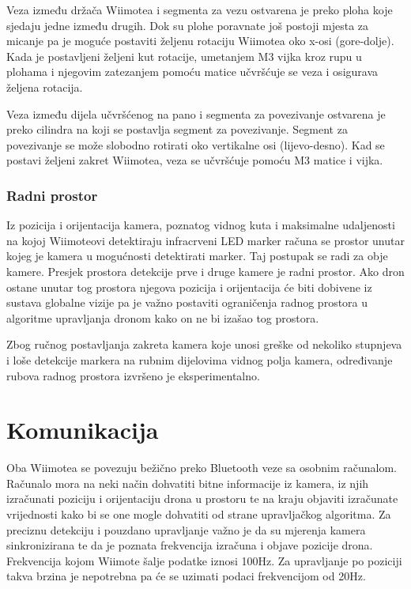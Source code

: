 \documentclass[times, utf8, diplomski]{fer}
\begin{document}
Veza između držača Wiimotea i segmenta za vezu ostvarena je preko ploha koje sjedaju jedne između drugih. Dok su plohe poravnate još postoji mjesta za micanje pa je moguće postaviti željenu rotaciju Wiimotea oko x-osi (gore-dolje). Kada je postavljeni željeni kut rotacije, umetanjem M3 vijka kroz rupu u plohama i njegovim zatezanjem pomoću matice učvršćuje se veza i osigurava željena rotacija.

Veza između dijela učvršćenog na pano i segmenta za povezivanje ostvarena je preko cilindra na koji se postavlja segment za povezivanje. Segment za povezivanje se može slobodno rotirati oko vertikalne osi (lijevo-desno). Kad se postavi željeni zakret Wiimotea, veza se učvršćuje pomoću M3 matice i vijka. 

\subsection{Radni prostor}
Iz pozicija i orijentacija kamera, poznatog vidnog kuta i maksimalne udaljenosti na kojoj Wiimoteovi detektiraju infracrveni LED marker računa se prostor unutar kojeg je kamera u mogućnosti detektirati marker. Taj postupak se radi za obje kamere. Presjek prostora detekcije prve i druge kamere je radni prostor. Ako dron ostane unutar tog prostora njegova pozicija i orijentacija će biti dobivene iz sustava globalne vizije pa je važno postaviti ograničenja radnog prostora u algoritme upravljanja dronom kako on ne bi izašao tog prostora.

Zbog ručnog postavljanja zakreta kamera koje unosi greške od nekoliko stupnjeva i loše detekcije markera na rubnim dijelovima vidnog polja kamera, određivanje rubova radnog prostora izvršeno je eksperimentalno.  

\chapter{Komunikacija}
Oba Wiimotea se povezuju bežično preko Bluetooth veze sa osobnim računalom. Računalo mora na neki način dohvatiti bitne informacije iz kamera, iz njih izračunati poziciju i orijentaciju drona u prostoru te na kraju objaviti izračunate vrijednosti kako bi se one mogle dohvatiti od strane upravljačkog algoritma. Za preciznu detekciju i pouzdano upravljanje važno je da su mjerenja kamera sinkronizirana te da je poznata frekvencija izračuna i objave pozicije drona. Frekvencija kojom Wiimote šalje podatke iznosi 100Hz. Za upravljanje po poziciji takva brzina je nepotrebna pa će se uzimati podaci frekvencijom od 20Hz.
\end{document}
